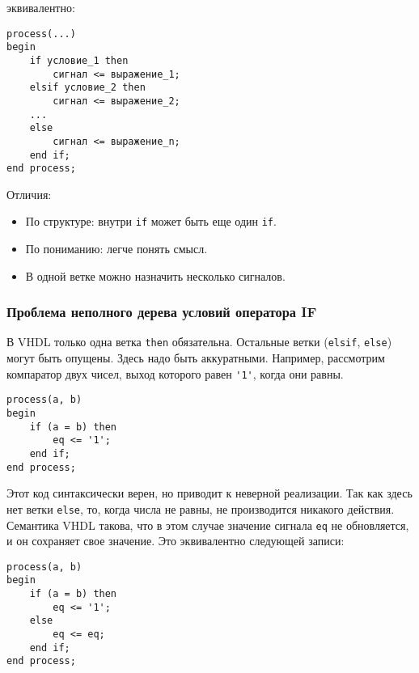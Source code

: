 эквивалентно:

\begin{Code}
\begin{lstlisting}
process(...)
begin
    if условие_1 then
        сигнал <= выражение_1;
    elsif условие_2 then
        сигнал <= выражение_2;
    ...
    else
        сигнал <= выражение_n;
    end if;
end process; 
\end{lstlisting}
\end{Code}

Отличия:

\begin{itemize}
\item По структуре: внутри \lstinline?if? может быть еще один \lstinline?if?.
\item По пониманию: легче понять смысл.
\item В одной ветке можно назначить несколько сигналов.
\end{itemize}

\subsubsection{Проблема неполного дерева условий оператора IF}

В VHDL только одна ветка \lstinline?then? обязательна. Остальные ветки (\lstinline?elsif?, \lstinline?else?) могут быть опущены. Здесь надо быть аккуратными. Например, рассмотрим компаратор двух чисел, выход которого равен \lstinline?'1'?, когда они равны.

\begin{Code}
\begin{lstlisting}
process(a, b)
begin
    if (a = b) then
        eq <= '1';
    end if;
end process;
\end{lstlisting}
\end{Code}

Этот код синтаксически верен, но приводит к неверной реализации. Так как здесь нет ветки \lstinline?else?, то, когда числа не равны, не производится никакого действия. Семантика VHDL такова, что в этом случае значение сигнала \lstinline?eq? не обновляется, и он сохраняет свое значение. Это эквивалентно следующей записи:

\begin{Code}
\begin{lstlisting}
process(a, b)
begin
    if (a = b) then
        eq <= '1';
    else
        eq <= eq;
    end if;
end process;
\end{lstlisting}
\end{Code}

